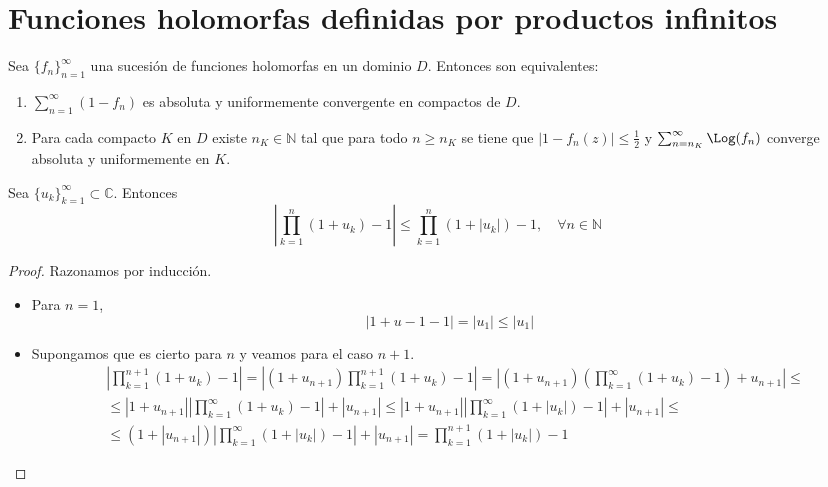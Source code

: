 \section{Funciones holomorfas definidas por productos infinitos}
\begin{theorem}
    Sea $\{f_n\}_{n=1}^\infty$ una sucesión de funciones holomorfas en un dominio $D$.
    Entonces son equivalentes:
    \begin{enumerate}
        \item $\sum_{n=1}^\infty (1-f_n)$ es absoluta y uniformemente convergente en compactos de $D$.
        \item Para cada compacto $K$ en $D$ existe $n_K \in \mathbb{N}$ tal que para todo $n \geq n_K$ se tiene que $|1-f_n(z)| \leq \frac{1}{2}$ y $\sum_{n=n_K}^\infty \Log(f_n)$ converge absoluta y uniformemente en $K$.
    \end{enumerate}
\end{theorem}

\begin{lemma}
    Sea $\{u_k\}_{k=1}^\infty \subset \mathbb{C}$.
    Entonces
    $$\left|\prod_{k=1}^n (1+u_k)-1\right| \leq \prod_{k=1}^n (1+|u_k|)-1, \quad \forall n \in \mathbb{N}$$
\end{lemma}

\begin{proof}
    Razonamos por inducción.
    \begin{itemize}
        \item Para $n = 1$,
              $$|1+u-1-1| = |u_1| \leq |u_1|$$

        \item Supongamos que es cierto para $n$ y veamos para el caso $n+1$.
              \begin{align*}
                   & \left|\prod_{k=1}^{n+1} (1+u_k) - 1\right| = \left|(1+u_{n+1})\prod_{k=1}^{n+1} (1+u_k) - 1\right| = \left|(1+u_{n+1})\left(\prod_{k=1}^\infty (1+u_k) - 1\right) + u_{n+1}\right| \leq \\
                   & \leq |1+u_{n+1}|\left|\prod_{k=1}^\infty (1+u_k) - 1\right| + |u_{n+1}| \leq |1+u_{n+1}|\left|\prod_{k=1}^\infty (1+|u_k|) - 1\right| + |u_{n+1}| \leq                                  \\
                   & \leq (1 + |u_{n+1}|)\left|\prod_{k=1}^\infty (1+|u_k|) - 1\right| + |u_{n+1}| = \prod_{k=1}^{n+1} (1+|u_k|) - 1
              \end{align*}
    \end{itemize}
\end{proof}

